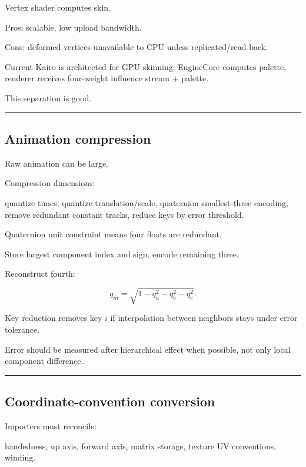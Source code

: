 Vertex shader computes skin.

Pros: scalable, low upload bandwidth.

Cons: deformed vertices unavailable to CPU unless replicated/read back.

Current Kairo is architected for GPU skinning: EngineCore computes palette, renderer receives four-weight influence stream + palette.

This separation is good.

\begin{center}\rule{0.5\linewidth}{0.5pt}\end{center}

\subsection{Animation compression}\label{04-visual-computing-ii-ch041-animation-compression}

Raw animation can be large.

Compression dimensions:

quantize times, quantize translation/scale, quaternion smallest-three encoding, remove redundant constant tracks, reduce keys by error threshold.

Quaternion unit constraint means four floats are redundant.

Store largest component index and sign, encode remaining three.

Reconstruct fourth:

\[
q_m=
\sqrt{
1-
q_a^2-
q_b^2-
q_c^2
}.
\]

Key reduction removes key \(i\) if interpolation between neighbors stays under error tolerance.

Error should be measured after hierarchical effect when possible, not only local component difference.

\begin{center}\rule{0.5\linewidth}{0.5pt}\end{center}

\subsection{Coordinate-convention conversion}\label{04-visual-computing-ii-ch041-coordinate-convention-conversion}

Importers must reconcile:

handedness, up axis, forward axis, matrix storage, texture UV conventions, winding.


